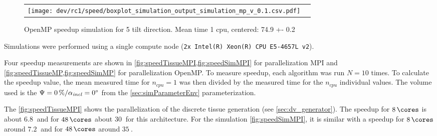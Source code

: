 %
\begin{figure}[!t]
\centering
%
\begin{lrbox}{\newtable}
\end{lrbox}
%
\begin{tabular}{cc}
\begin{minipage}{0.6\textwidth}
\texttt{[image: dev/rc1/speed/boxplot\_simulation\_output\_simulation\_mp\_v\_0.1.csv.pdf]}
\end{minipage}
&
\begin{minipage}{0.25\textwidth}
\usebox{\newtable}
\end{minipage}
\end{tabular}
\caption{\ac{OpenMP} speedup simulation for 5 tilt direction. Mean time 1 cpu, centered: 74.9 +- 0.2}
\label{fig:speedSimMP}
\end{figure}
%
Simulations were performed using a single compute node (\texttt{2x Intel(R) Xeon(R) CPU E5-4657L v2}).
\par
%
Four speedup measurements are shown in \cref{fig:speedTissueMPI,fig:speedSimMPI} for parallelization \ac{MPI} and \cref{fig:speedTissueMP,fig:speedSimMP} for parallelization \ac{OpenMP}.
To measure speedup, each algorithm was run $N=10$ times.
To calculate the speedup value, the mean measured time for $n_\mathit{cpu}=1$ was then divided by the measured time for the $n_\mathit{cpu}$ individual values.
The volume used is the $\textnormal{$\Psi$}=\SI{0}{\percent} / \textnormal{$\alpha_{\mathit{incl}}$}=\SI{0}{\degree}$ from the \cref{sec:simParameterEnv} parameterization.
\par
%
The \cref{fig:speedTissueMPI} shows the parallelization of the discrete tissue generation (see \cref{sec:dv_generator}).
The speedup for $\SI{8}{\cores}$ is about $\SI{6.8}{}$ and for $\SI{48}{\cores}$ about $\SI{30}{}$ for this architecture.
For the simulation \cref{fig:speedSimMPI}, it is similar with a speedup for $\SI{8}{\cores}$ around $\SI{7.2}{}$ and for $\SI{48}{\cores}$ around $\SI{35}{}$.
